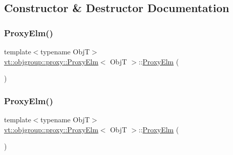 \subsection{Constructor \& Destructor Documentation}
\mbox{\label{structvt_1_1objgroup_1_1proxy_1_1_proxy_elm_ad610547c98659b9d34a6dca416a4d319}} 
\subsubsection{\texorpdfstring{Proxy\+Elm()}{ProxyElm()}\hspace{0.1cm}{\footnotesize\ttfamily [1/4]}}
{\footnotesize\ttfamily template$<$typename ObjT$>$ \\
\hyperlink{structvt_1_1objgroup_1_1proxy_1_1_proxy_elm}{vt\+::objgroup\+::proxy\+::\+Proxy\+Elm}$<$ ObjT $>$\+::\hyperlink{structvt_1_1objgroup_1_1proxy_1_1_proxy_elm}{Proxy\+Elm} (\begin{DoxyParamCaption}{ }\end{DoxyParamCaption})\hspace{0.3cm}{\ttfamily [default]}}

\mbox{\label{structvt_1_1objgroup_1_1proxy_1_1_proxy_elm_a50590ebf12e4ae89fc140583412d05b0}} 
\subsubsection{\texorpdfstring{Proxy\+Elm()}{ProxyElm()}\hspace{0.1cm}{\footnotesize\ttfamily [2/4]}}
{\footnotesize\ttfamily template$<$typename ObjT$>$ \\
\hyperlink{structvt_1_1objgroup_1_1proxy_1_1_proxy_elm}{vt\+::objgroup\+::proxy\+::\+Proxy\+Elm}$<$ ObjT $>$\+::\hyperlink{structvt_1_1objgroup_1_1proxy_1_1_proxy_elm}{Proxy\+Elm} (\begin{DoxyParamCaption}\item[{\hyperlink{structvt_1_1objgroup_1_1proxy_1_1_proxy_elm}{Proxy\+Elm}$<$ ObjT $>$ const \&}]{ }\end{DoxyParamCaption})\hspace{0.3cm}{\ttfamily [default]}}

